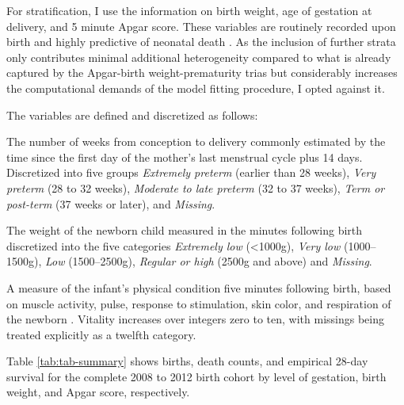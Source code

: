 \documentclass[10pt,twoside,reqno]{article}
\providecommand{\tightlist}{%
  \setlength{\topsep}{0pt}
  \setlength{\partopsep}{0pt}
  \setlength{\itemsep}{0pt}
  \setlength{\parsep}{.9\parskip}
}
\begin{document}
For stratification, I use the information on birth weight, age of gestation at delivery, and 5 minute Apgar score. These variables are routinely recorded upon birth and highly predictive of neonatal death \citep{Pollack2000, Casey2001, Park2018}. As the inclusion of further strata only contributes minimal additional heterogeneity compared to what is already captured by the Apgar-birth weight-prematurity trias but considerably increases the computational demands of the model fitting procedure, I opted against it.

The variables are defined and discretized as follows:

\begin{description}
\tightlist
\item[Gestation at delivery alias prematurity]
The number of weeks from conception to delivery commonly estimated by the time since the first day of the mother's last menstrual cycle plus 14 days. Discretized into five groups \emph{Extremely preterm} (earlier than 28 weeks), \emph{Very preterm} (28 to 32 weeks), \emph{Moderate to late preterm} (32 to 37 weeks), \emph{Term or post-term} (37 weeks or later), and \emph{Missing}.
\item[Birth weight]
The weight of the newborn child measured in the minutes following birth discretized into the five categories \emph{Extremely low} (\textless1000g), \emph{Very low} (1000--1500g), \emph{Low} (1500--2500g), \emph{Regular or high} (2500g and above) and \emph{Missing}.
\item[5 minute Apgar score]
A measure of the infant's physical condition five minutes following birth, based on muscle activity, pulse, response to stimulation, skin color, and respiration of the newborn \citep{Apgar1953}. Vitality increases over integers zero to ten, with missings being treated explicitly as a twelfth category.
\end{description}

Table \ref{tab:tab-summary} shows births, death counts, and empirical 28-day survival for the complete 2008 to 2012 birth cohort by level of gestation, birth weight, and Apgar score, respectively.
\end{document}
